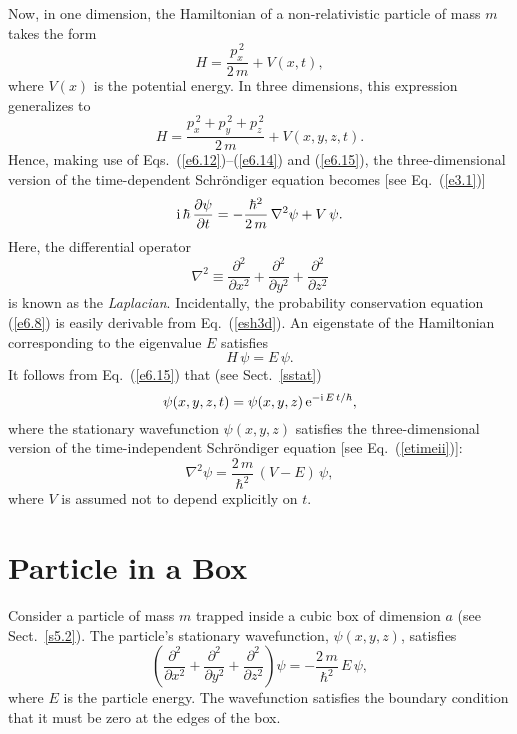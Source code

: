 Now, in one dimension, the Hamiltonian of a non-relativistic particle
of mass $m$ takes the form
\begin{equation}
H = \frac{p_x^{\,2}}{2\,m} + V(x,t),
\end{equation}
where $V(x)$ is the potential energy. In three dimensions, this expression
generalizes to
\begin{equation}
H = \frac{p_x^{\,2}+ p_y^{\,2}+p_z^{\,2}}{2\,m} + V(x,y,z,t).
\end{equation}
Hence, making use of Eqs.~(\ref{e6.12})--(\ref{e6.14}) and (\ref{e6.15}), the three-dimensional version of the time-dependent Schr\"{o}ndiger equation
becomes [see Eq.~(\ref{e3.1})]
\begin{equation}\label{esh3d}
{\rm i}\,\hbar\,\frac{\partial\psi}{\partial t} = - \frac{\hbar^2}{2\,m}\,
\nabla^2\psi + V\,\psi.
\end{equation}
Here, the differential operator
\begin{equation}
\nabla^2 \equiv \frac{\partial^2}{\partial x^2} + \frac{\partial^2}{\partial
y^2} + \frac{\partial^2}{\partial z^2}
\end{equation}
is known as the {\em Laplacian}. Incidentally, the probability conservation equation 
(\ref{e6.8}) is easily derivable from Eq.~(\ref{esh3d}).
An eigenstate of the Hamiltonian corresponding
to the eigenvalue $E$ satisfies
\begin{equation}
H\,\psi = E\,\psi.
\end{equation}
It follows from Eq.~(\ref{e6.15}) that (see Sect.~\ref{sstat})
\begin{equation}
\psi(x,y,z,t) = \psi(x,y,z)\,{\rm e}^{-{\rm i}\,E\,t/\hbar},
\end{equation}
where the stationary wavefunction $\psi(x,y,z)$ satisfies the
three-dimensional version of the time-independent Schr\"{o}ndiger equation
[see Eq.~(\ref{etimeii})]:
\begin{equation}
\nabla^2\psi = \frac{2\,m}{\hbar^2}\,(V-E)\,\psi,
\end{equation}
where $V$ is assumed not to depend explicitly on $t$.

\section{Particle in a Box}
Consider a particle of mass $m$ trapped inside a cubic box of dimension $a$ (see Sect.~\ref{s5.2}). The particle's stationary wavefunction, $\psi(x,y,z)$, satisfies
\begin{equation}\label{e6.21}
\left(\frac{\partial^2}{\partial x^2} + \frac{\partial^2}{\partial y^2} + \frac{\partial^2}{\partial z^2}\right)\psi = -\frac{2\,m}{\hbar^2}\,E\,\psi,
\end{equation}
where $E$ is the particle energy. The wavefunction satisfies the boundary
condition that it must be zero at the edges of the box.

